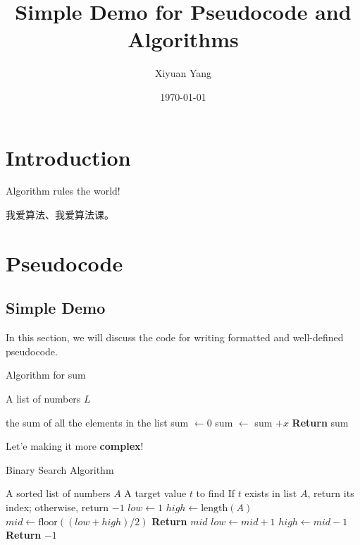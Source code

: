 \documentclass{article}
\title{Simple Demo for Pseudocode and Algorithms}
\author{Xiyuan Yang}
\date{\today}
\begin{document}
\maketitle
\section{Introduction}

Algorithm rules the world!

我爱算法、我爱算法课。

\section{Pseudocode}

\subsection{Simple Demo}

In this section, we will discuss the code for writing formatted and well-defined pseudocode.

\begin{algorithm}[H]
    \caption{Algorithm for sum}
    \label{alg:sum_algorithm}
    \begin{algorithmic}[1]
        \Require A list of numbers $L$

        \Ensure the sum of all the elements in the list
        \State sum $\gets 0$
        \State sum $\gets$ sum $+ x$
        \EndFor
        \State \textbf{Return} sum
    \end{algorithmic}
\end{algorithm}

Let'e making it more \textbf{complex}!

\begin{algorithm}[H]
    \caption{Binary Search Algorithm}
    \label{alg:binary_search}
    \begin{algorithmic}[1]
        \Require A sorted list of numbers $A$
        \Require A target value $t$ to find
        \Ensure If $t$ exists in list $A$, return its index; otherwise, return $-1$
        \State $low \gets 1$
        \State $high \gets \text{length}(A)$
        \State $mid \gets \text{floor}((low + high) / 2)$
        \State \textbf{Return} $mid$
        \State $low \gets mid + 1$
        \Else
        \State $high \gets mid - 1$
        \EndIf
        \EndWhile
        \State \textbf{Return} $-1$
    \end{algorithmic}
\end{algorithm}
\end{document}
